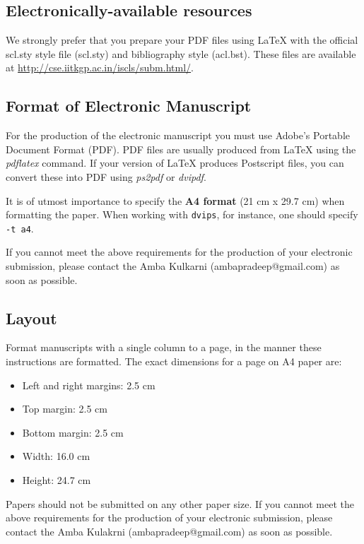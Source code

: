 \documentclass[11pt]{article}
\begin{document}
	\subsection{Electronically-available resources}
	
	We strongly prefer that you prepare your PDF files using \LaTeX{} with
	the official scl.sty style file (scl.sty) and bibliography style
	(acl.bst). These files are available at
	\url{http://cse.iitkgp.ac.in/iscls/subm.html/}.
	
	
	\subsection{Format of Electronic Manuscript}
	\label{sect:pdf}
	
	For the production of the electronic manuscript you must use Adobe's
	Portable Document Format (PDF). PDF files are usually produced from
	\LaTeX{} using the \textit{pdflatex} command. If your version of
	\LaTeX{} produces Postscript files, you can convert these into PDF
	using \textit{ps2pdf} or \textit{dvipdf}.
	
	It is of utmost importance to specify the \textbf{A4 format} (21 cm
	x 29.7 cm) when formatting the paper. When working with
	{\tt dvips}, for instance, one should specify {\tt -t a4}.
	
	If you cannot meet the above requirements for the
	production of your electronic submission, please contact the
	Amba Kulkarni (ambapradeep@gmail.com) as soon as possible.
	
	\subsection{Layout}
	\label{ssec:layout}
	
	Format manuscripts with a single column to a page, in the manner these
	instructions are formatted. The exact dimensions for a page on A4
	paper are:
	
	\begin{itemize}
		\item Left and right margins: 2.5 cm
		\item Top margin: 2.5 cm
		\item Bottom margin: 2.5 cm
		\item Width: 16.0 cm
		\item Height: 24.7 cm
	\end{itemize}
	
	\noindent Papers should not be submitted on any other paper size.
	If you cannot meet the above requirements for
	the production of your electronic submission, please contact the
	Amba Kulakrni (ambapradeep@gmail.com) as soon as possible.
	
\end{document}
